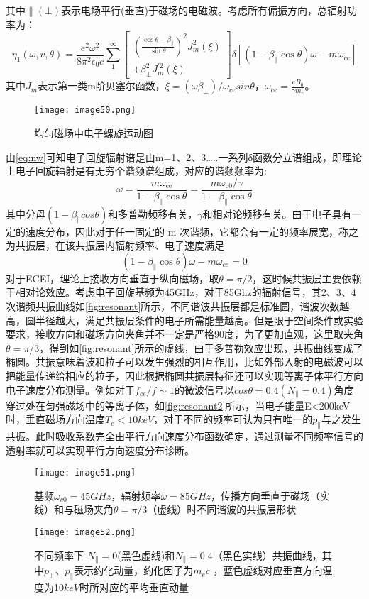 其中$∥(⊥)$表示电场平行(垂直)于磁场的电磁波。考虑所有偏振方向，总辐射功率为：
\begin{equation}
\eta_{1}(\omega, v, \theta)=\frac{e^{2} \omega^{2}}{8 \pi^{2} \epsilon_{0} c}  \sum_{1}^{\infty}\left[\begin{array}{c}\left(\frac{\cos \theta-\beta_{\|}}{\sin \theta}\right)^{2} J_{m}^{2}(\xi) \\+\beta_{\perp}^{2} J_{m}^{\prime2}(\xi)\end{array}\right] \delta\left[\left(1-\beta_{\|} \cos \theta\right) \omega-m \omega_{c e}\right]
\end{equation}
其中$J_m$表示第一类m阶贝塞尔函数，$ξ=(ωβ_⊥)/ω_{ce} sinθ$，$ω_{ce}=\frac{eB_0}{γm_e} $。
\begin{figure}[ht]
\centering
\texttt{[image: image50.png]}
\caption{\label{fig:elecorb}均匀磁场中电子螺旋运动图}
\end{figure}
由\autoref{eq:nw}可知电子回旋辐射谱是由m=1、2、3…..一系列δ函数分立谱组成，即理论上电子回旋辐射是有无穷个谐频谱组成，对应的谐频频率为: 
\begin{equation}\label{eq:resonant}
\omega=\frac{m \omega_{\mathrm{ce}}}{1-\beta_{\|} \cos \theta}=\frac{{m \omega_{\mathrm{c} 0}}/{\gamma}}{1-\beta_{\|} \cos \theta}
\end{equation}
其中分母$(1-β_∥ cosθ)$和多普勒频移有关，$γ$和相对论频移有关。由于电子具有一定的速度分布，因此对于任一固定的 m 
次谐频，它都会有一定的频率展宽，称之为共振层，在该共振层内辐射频率、电子速度满足
\begin{equation}
\left(1-\beta_{\|} \cos \theta\right) \omega-m \omega_{c e}=0
\end{equation}
对于ECEI，理论上接收方向垂直于纵向磁场，取$θ=π/2$，这时候共振层主要依赖于相对论效应。考虑电子回旋基频为45GHz，对于85Ghz的辐射信号，其2、3、4次谐频共振曲线如\autoref{fig:resonant}所示，不同谐波共振层都是标准圆，谐波次数越高，圆半径越大，满足共振层条件的电子所需能量越高。但是限于空间条件或实验要求，接收方向和磁场方向夹角并不一定是严格90度，为了更加直观，这里取夹角$θ=π/3$，得到如\autoref{fig:resonant}所示的虚线，由于多普勒效应出现，共振曲线变成了椭圆。共振意味着波和粒子可以发生强烈的相互作用，比如外部入射的电磁波可以把能量传递给相应的粒子，因此根据椭圆共振层特征还可以实现等离子体平行方向电子速度分布测量。例如对于$f_{ce}/f\sim1$的微波信号以$cosθ=0.4(N_∥=0.4)$角度穿过处在匀强磁场中的等离子体，如\autoref{fig:resonant2}所示，当电子能量E<200keV时，垂直磁场方向温度$T_e<10keV$，对于不同的频率可认为只有唯一的$p_∥$与之发生共振。此时吸收系数完全由平行方向速度分布函数确定，通过测量不同频率信号的透射率就可以实现平行方向速度分布诊断\cite{RN1413}。
\begin{figure}[ht]
\centering
\texttt{[image: image51.png]}
\caption{\label{fig:resonant}基频$ω_{c0}=45GHz$，辐射频率$ω=85GHz$，传播方向垂直于磁场（实线）和与磁场夹角$θ=π/3$（虚线）时不同谐波的共振层形状}
\end{figure}
\begin{figure}[ht]
\centering
\texttt{[image: image52.png]}
\caption{\label{fig:resonant2}不同频率下 $N_∥=0$(黑色虚线)和$N_∥=0.4$（黑色实线）共振曲线，其中$p_⊥ $、$p_∥ $表示约化动量，约化因子为$m_e c$ ，蓝色虚线对应垂直方向温度为10$keV$时所对应的平均垂直动量}
\end{figure}
